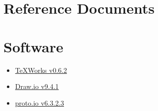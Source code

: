 \section{Reference Documents}

\section{Software}
\begin{itemize}
\item \href{http://www.tug.org/texworks/}{TeXWorks v0.6.2}
\item \href{https://about.draw.io/}{Draw.io v9.4.1}
\item \href{https://proto.io/}{proto.io v6.3.2.3}
\end{itemize}